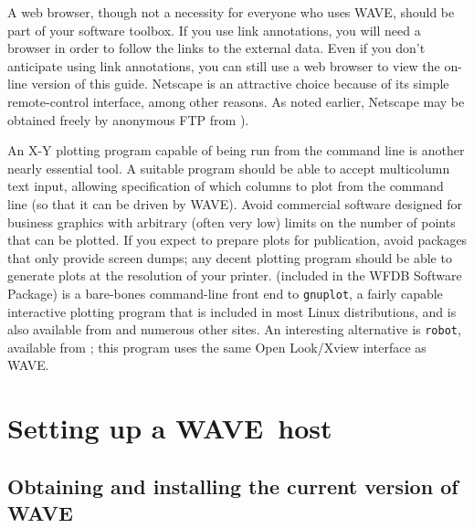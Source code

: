 \documentclass[twoside]{book}
\newcommand{\WAVE}{{\sf WAVE}\xspace}
\begin{document}
A web browser, though not a necessity for everyone who uses \WAVE{},
should be part of your software toolbox.  If you use link annotations,
you will need a browser in order to follow the links to the external
data.  Even if you don't anticipate using link annotations, you can
still use a web browser to view the on-line version of this guide.
Netscape is an attractive choice because of its simple remote-control
interface, among other reasons. As noted earlier, Netscape may be
obtained freely by anonymous FTP from
).

An X-Y plotting program capable of being run from the command line is another
nearly essential tool.  A suitable program should be able to accept multicolumn
text input, allowing specification of which columns to plot from the
command line (so that it can be driven by \WAVE{}).  Avoid commercial software
designed for business graphics with arbitrary (often very low) limits
on the number of points that can be plotted.  If you expect to prepare
plots for publication, avoid packages that only provide screen dumps;
any decent plotting program should be able to generate plots
at the resolution of your printer.  
(included in the WFDB Software Package) is a
bare-bones command-line front end to {\tt gnuplot}, a fairly capable
interactive plotting program that is included in most Linux distributions,
and is also available from
 and
numerous other sites.  An interesting alternative is {\tt robot}, available
from ;
this program uses the same Open Look/Xview interface as \WAVE{}.

\chapter{Setting up a \WAVE{}~host}

\label{app:setup}
\section{Obtaining and installing the current version of \WAVE{}}
\end{document}
